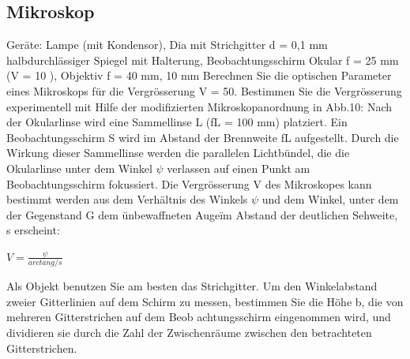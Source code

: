 \subsection{Mikroskop}
Geräte: Lampe (mit Kondensor), Dia mit Strichgitter d = 0,1 mm halbdurchlässiger Spiegel mit Halterung, Beobachtungsschirm Okular f = 25 mm (V = 10 ), Objektiv f = 40 mm, 10 mm Berechnen Sie die optischen Parameter eines Mikroskops für die Vergrösserung V = 50. Bestimmen Sie die Vergrösserung experimentell mit Hilfe der modifizierten Mikroskopanordnung in Abb.10: Nach der Okularlinse wird eine Sammellinse L (fL = 100 mm) platziert. Ein Beobachtungsschirm S wird im Abstand der Brennweite fL aufgestellt. Durch die Wirkung dieser Sammellinse werden die parallelen Lichtbündel, die die Okularlinse unter
dem Winkel $\psi$ verlassen auf einen Punkt am Beobachtungsschirm fokussiert. Die Vergrösserung V
des Mikroskopes kann bestimmt werden aus dem Verhältnis des Winkels $\psi$
und dem Winkel, unter
dem der Gegenstand G dem ünbewaffneten Augeïm Abstand der deutlichen Sehweite, s erscheint:
\begin{center}
 $V=\frac{\psi}{arctan g/s}$
\end{center}
Als Objekt benutzen Sie am besten das Strichgitter. Um den Winkelabstand zweier Gitterlinien auf
dem Schirm zu messen, bestimmen Sie die Höhe b, die von mehreren Gitterstrichen auf dem Beob
achtungsschirm eingenommen wird, und dividieren sie durch die Zahl der Zwischenräume zwischen
den betrachteten Gitterstrichen.
